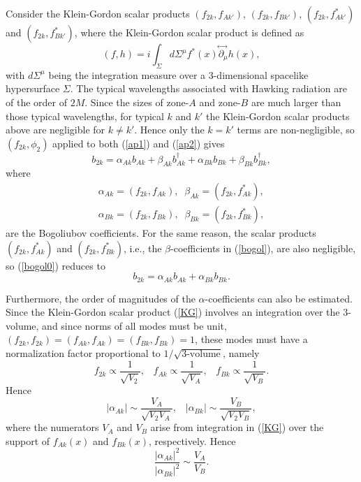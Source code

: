 \documentclass[aps,prd,onecolumn,groupedaddress,showkeys,12pt]{revtex4-2}
\begin{document}
Consider the Klein-Gordon scalar products $(f_{2k},f_{Ak'})$, $(f_{2k},f_{Bk'})$,
$(f_{2k},f_{Ak'}^*)$ and $(f_{2k},f_{Bk'}^*)$, where the Klein-Gordon scalar product is defined as \cite{bd}
\begin{equation}\label{KG}
 (f,h)=i\int_{\Sigma} d\Sigma^{\mu}f^*(x)  \!\stackrel{\leftrightarrow\;}{ \partial_\mu }\! h(x) ,
\end{equation}
with $d\Sigma^{\mu}$ being the integration measure over a 3-dimensional spacelike hypersurface $\Sigma$.
The typical wavelengths associated with Hawking radiation are of the order of $2M$.
Since the sizes of zone-$A$ and zone-$B$ are much larger than those typical wavelengths,
for typical $k$ and $k'$ the Klein-Gordon scalar products above are negligible for $k\neq k'$.
Hence only the $k=k'$ terms are non-negligible,  
so $(f_{2k}, \phi_2)$ applied to both (\ref{ap1}) and (\ref{ap2}) gives
\begin{equation}\label{bogol0}
 b_{2k}= \alpha_{Ak}b_{Ak} + \beta_{Ak}b_{Ak}^\dagger + \alpha_{Bk}b_{Bk} + \beta_{Bk}b_{Bk}^\dagger ,
\end{equation}
where
\begin{eqnarray}\label{bogol}
 \alpha_{Ak}=(f_{2k},f_{Ak}), \;\; \beta_{Ak} = (f_{2k},f_{Ak}^*) ,
\nonumber \\
\alpha_{Bk}=(f_{2k},f_{Bk}), \;\; \beta_{Bk} = (f_{2k},f_{Bk}^*) ,
\end{eqnarray}
are the Bogoliubov coefficients.
For the same reason, the scalar products $(f_{2k},f_{Ak}^*)$ and $(f_{2k},f_{Bk}^*)$, i.e., 
the $\beta$-coefficients in (\ref{bogol}), are also negligible, so (\ref{bogol0}) reduces to
\begin{equation}\label{bogol1}
 b_{2k}= \alpha_{Ak}b_{Ak} + \alpha_{Bk}b_{Bk}. 
\end{equation}

Furthermore, the order of magnitudes of the $\alpha$-coefficients can also be estimated.
Since the Klein-Gordon scalar product (\ref{KG}) involves an integration over the 3-volume, and since 
norms of all modes must be unit, $(f_{2k},f_{2k})=(f_{Ak},f_{Ak})=(f_{Bk},f_{Bk})=1$, 
these modes must have a normalization factor proportional to $1/\sqrt{\text{3-volume}}$, namely
\begin{equation}
 f_{2k}\propto \frac{1}{\sqrt{V_2}} , \;\;\; f_{Ak}\propto \frac{1}{\sqrt{V_A}} , \;\;\; f_{Bk}\propto \frac{1}{\sqrt{V_B}} . 
\end{equation}
Hence
\begin{equation}
 |\alpha_{Ak}| \sim \frac{V_A}{\sqrt{V_2V_A}}, \;\;\; |\alpha_{Bk}| \sim \frac{V_B}{\sqrt{V_2V_B}} , 
\end{equation}
where the numerators $V_A$ and $V_B$ arise from integration in (\ref{KG}) over the support of $f_{Ak}(x)$ and $f_{Bk}(x)$, 
respectively. Hence
\begin{equation}\label{aVAB}
 \frac{|\alpha_{Ak}|^2 }{|\alpha_{Bk}|^2} \sim \frac{V_A}{V_B} .
\end{equation}
\end{document}
